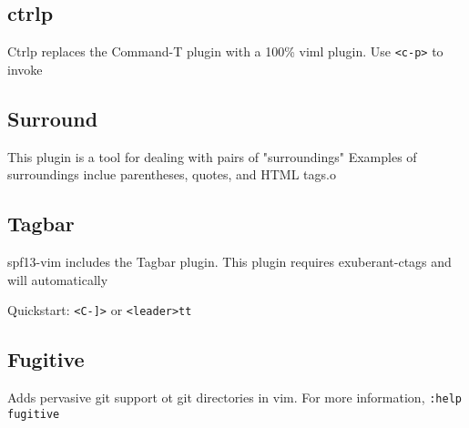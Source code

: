 \documentclass[11pt]{book}
\begin{document}
 \subsection{ctrlp}
 Ctrlp replaces the Command-T plugin with a 100\% viml plugin. Use \verb|<c-p>| 
 to invoke
 \subsection{Surround}
 This plugin is a tool for dealing with pairs of "surroundings" Examples of 
 surroundings inclue parentheses, quotes, and HTML tags.o
 \subsection{Tagbar}
 spf13-vim includes the Tagbar plugin. This plugin requires exuberant-ctags 
 and will automatically 

 Quickstart: \verb|<C-]>| or \verb|<leader>tt|
 \subsection{Fugitive}
 Adds pervasive git support ot git directories in vim. For more information, 
 \verb|:help fugitive|
\end{document}
